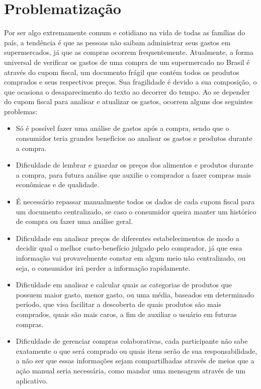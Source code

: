 \section{Problematização}
Por ser algo extremamente comum e cotidiano na vida de todas as famílias do país, a tendência é que as pessoas não saibam administrar seus gastos em supermercados, já que as compras ocorrem frequentemente. Atualmente, a forma universal de verificar os gastos de uma compra de um supermercado no Brasil é através do cupom fiscal, um documento frágil que contém todos os produtos comprados e seus respectivos preços. Sua fragilidade é devido a sua composição, o que ocasiona o desaparecimento do texto ao decorrer do tempo.
Ao se depender do cupom fiscal para analisar e atualizar os gastos, ocorrem alguns dos seguintes problemas:
\begin{itemize}
\item Só é possível fazer uma análise de gastos após a compra, sendo que o consumidor teria grandes benefícios ao analisar os gastos e produtos durante a compra.
\item Dificuldade de lembrar e guardar os preços dos alimentos e produtos durante a compra, para futura análise que auxilie o comprador a fazer compras mais econômicas e de qualidade.
\item É necessário repassar manualmente todos os dados de cada cupom fiscal para um documento centralizado, se caso o consumidor queira manter um histórico de compra ou fazer uma análise geral.
\item Dificuldade em analisar preços de diferentes estabelecimentos de modo a decidir qual o melhor custo-benefício julgado pelo comprador, já que essa informação vai provavelmente constar em algum meio não centralizado, ou seja, o consumidor irá perder a informação rapidamente.
\item Dificuldade em analisar e calcular quais as categorias de produtos que possuem maior gasto, menor gasto, ou uma média, baseados em determinado período, que visa facilitar a descoberta de quais produtos são mais comprados, quais são mais caros, a fim de auxiliar o usuário em futuras compras.
\item Dificuldade de gerenciar compras colaborativas, cada participante não sabe exatamente o que será comprado ou quais itens serão de sua responsabilidade, a não ser que essas informações sejam compartilhadas através de meios que a ação manual seria necessária, como mandar uma mensagem através de um aplicativo.
\end{itemize}


